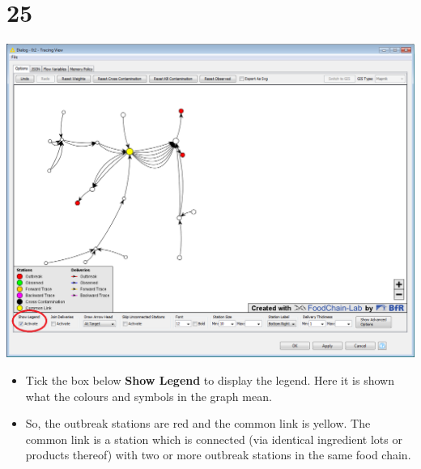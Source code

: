 \documentclass[10pt]{beamer}
\begin{document}
\section{25}
\begin{frame}
	\begin{center}
			\includegraphics[height=0.6\textheight]{25.png}
	\end{center}
	\begin{itemize}
		\item Tick the box below \textbf{Show Legend} to display the legend. Here it is shown what the colours and symbols in the graph mean.
		\item So, the outbreak stations are red and the common link is yellow. The common link is a station which is connected (via identical ingredient lots or products thereof) with two or more outbreak stations in the same food chain.
	\end{itemize}
\end{frame}
\end{document}
